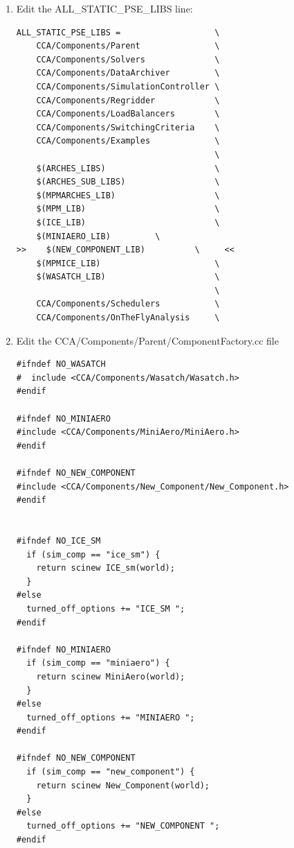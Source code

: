 \documentclass[12pt]{report}
\begin{document}
\begin{enumerate}
\item Edit the ALL\_STATIC\_PSE\_LIBS  line:

\begin{verbatim}
ALL_STATIC_PSE_LIBS =                   \
    CCA/Components/Parent               \
    CCA/Components/Solvers              \
    CCA/Components/DataArchiver         \
    CCA/Components/SimulationController \
    CCA/Components/Regridder            \
    CCA/Components/LoadBalancers        \
    CCA/Components/SwitchingCriteria    \
    CCA/Components/Examples             \
                                        \
    $(ARCHES_LIBS)                      \
    $(ARCHES_SUB_LIBS)                  \
    $(MPMARCHES_LIB)                    \
    $(MPM_LIB)                          \
    $(ICE_LIB)                          \
    $(MINIAERO_LIB)			\
>>    $(NEW_COMPONENT_LIB)			\     <<
    $(MPMICE_LIB)                       \
    $(WASATCH_LIB)                      \
                                        \
    CCA/Components/Schedulers           \
    CCA/Components/OnTheFlyAnalysis     \

\end{verbatim}

\item Edit the CCA/Components/Parent/ComponentFactory.cc file

\begin{verbatim}
#ifndef NO_WASATCH
#  include <CCA/Components/Wasatch/Wasatch.h>
#endif

#ifndef NO_MINIAERO
#include <CCA/Components/MiniAero/MiniAero.h>
#endif

#ifndef NO_NEW_COMPONENT
#include <CCA/Components/New_Component/New_Component.h>
#endif


#ifndef NO_ICE_SM  
  if (sim_comp == "ice_sm") {
    return scinew ICE_sm(world);
  }
#else
  turned_off_options += "ICE_SM ";
#endif
  
#ifndef NO_MINIAERO
  if (sim_comp == "miniaero") {
    return scinew MiniAero(world);
  }
#else
  turned_off_options += "MINIAERO ";
#endif

#ifndef NO_NEW_COMPONENT
  if (sim_comp == "new_component") {
    return scinew New_Component(world);
  }
#else
  turned_off_options += "NEW_COMPONENT ";
#endif
\end{verbatim}


\end{enumerate}
\end{document}
